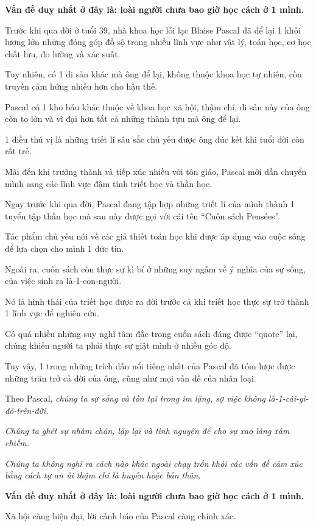 \documentclass{book}
\numberwithin{equation}{section}
\begin{document}
\textbf{Vấn đề duy nhất ở đây là: loài người chưa bao giờ học cách ở 1 mình.}

%
Trước khi qua đời ở tuổi 39, nhà khoa học lỗi lạc Blaise Pascal đã để lại 1 khối lượng lớn những đóng góp đồ sộ trong nhiều lĩnh vực như vật lý, toán học, cơ học chất lưu, đo lường và xác suất.

%
Tuy nhiên, có 1 di sản khác mà ông để lại, không thuộc khoa học tự nhiên, còn truyền cảm hứng nhiều hơn cho hậu thế.

Pascal có 1 kho báu khác thuộc về khoa học xã hội, thậm chí, di sản này của ông còn to lớn và vĩ đại hơn tất cả những thành tựu mà ông để lại.

%
1 điều thú vị là những triết lí sâu sắc chủ yếu được ông đúc kết khi tuổi đời còn rất trẻ.

Mãi đến khi trưởng thành và tiếp xúc nhiều với tôn giáo, Pascal mới dần chuyển mình sang các lĩnh vực đậm tính triết học và thần học. 

%
Ngay trước khi qua đời, Pascal đang tập hợp những triết lí của mình thành 1 tuyển tập thần học mà sau này được gọi với cái tên ``Cuốn sách Pensées''.

Tác phẩm chủ yếu nói về các giả thiết toán học khi được áp dụng vào cuộc sống để lựa chọn cho mình 1 đức tin.

Ngoài ra, cuốn sách còn thực sự kì bí ở những suy ngẫm về ý nghĩa của sự sống, của việc sinh ra là-1-con-người.

Nó là hình thái của triết học được ra đời trước cả khi triết học thực sự trở thành 1 lĩnh vực để nghiên cứu.

%
Có quá nhiều những suy nghĩ tâm đắc trong cuốn sách đáng được ``quote'' lại, chúng khiến người ta phải thực sự giật mình ở nhiều góc độ.

Tuy vậy, 1 trong những trích dẫn nổi tiếng nhất của Pascal đã tóm lược được những trăn trở cả đời của ông, cũng như mọi vấn đề của nhân loại.

%
Theo Pascal, \textit{chúng ta sợ sống và tồn tại trong im lặng, sợ việc không là-1-cái-gì-đó-trên-đời.}

\textit{Chúng ta ghét sự nhàm chán, lặp lại và tình nguyện để cho sự xao lãng xâm chiếm.}

\textit{Chúng ta không nghĩ ra cách nào khác ngoài chạy trốn khỏi các vấn đề cảm xúc bằng cách tự an ủi thậm chí là huyễn hoặc bản thân}.

%
\textbf{Vấn đề duy nhất ở đây là: loài người chưa bao giờ học cách ở 1 mình.}

%
Xã hội càng hiện đại, lời cảnh báo của Pascal càng chính xác.
\end{document}
